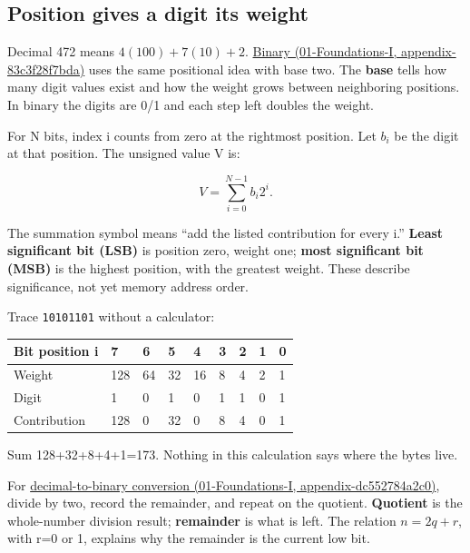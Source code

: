 \subsection{Position gives a digit its weight}\label{05-engine-i-ch001-position-gives-a-digit-its-weight}

Decimal 472 means \(4(100)+7(10)+2\). \href{../01-Foundations-I/main.pdf\#nameddest=appendix-83c3f28f7bda}{Binary (01-Foundations-I, appendix-83c3f28f7bda)} uses the same positional idea with base two. The \textbf{base} tells how many digit values exist and how the weight grows between neighboring positions. In binary the digits are 0/1 and each step left doubles the weight.

For N bits, index i counts from zero at the rightmost position. Let \(b_i\) be the digit at that position. The unsigned value V is:

\[
V=\sum_{i=0}^{N-1}b_i2^i.
\]

The summation symbol means ``add the listed contribution for every i.'' \textbf{Least significant bit (LSB)} is position zero, weight one; \textbf{most significant bit (MSB)} is the highest position, with the greatest weight. These describe significance, not yet memory address order.

Trace \texttt{10101101} without a calculator:

{\def\LTcaptype{none} %
\begin{longtable}[]{@{}lllllllll@{}}
\toprule\noalign{}
Bit position i & 7 & 6 & 5 & 4 & 3 & 2 & 1 & 0 \\
\midrule\noalign{}
\endhead
\bottomrule\noalign{}
\endlastfoot
Weight & 128 & 64 & 32 & 16 & 8 & 4 & 2 & 1 \\
Digit & 1 & 0 & 1 & 0 & 1 & 1 & 0 & 1 \\
Contribution & 128 & 0 & 32 & 0 & 8 & 4 & 0 & 1 \\
\end{longtable}
}

Sum 128+32+8+4+1=173. Nothing in this calculation says where the bytes live.

For \href{../01-Foundations-I/main.pdf\#nameddest=appendix-dc552784a2c0}{decimal-to-binary conversion (01-Foundations-I, appendix-dc552784a2c0)}, divide by two, record the remainder, and repeat on the quotient. \textbf{Quotient} is the whole-number division result; \textbf{remainder} is what is left. The relation \(n=2q+r\), with r=0 or 1, explains why the remainder is the current low bit.

